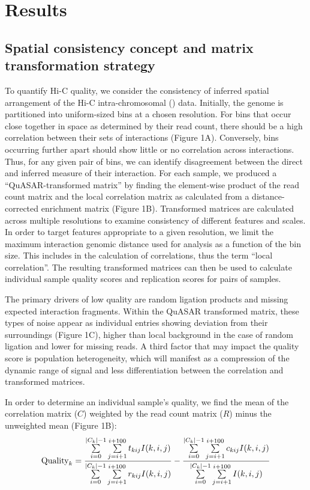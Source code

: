 \section{Results}
\subsection{Spatial consistency concept and matrix transformation strategy}

To quantify Hi-C quality, we consider the consistency of inferred spatial arrangement of the Hi-C intra-chromosomal (\cis) data. Initially, the genome is partitioned into uniform-sized bins at a chosen resolution. For bins that occur close together in space as determined by their read count, there should be a high correlation between their sets of \cis interactions (Figure 1A). Conversely, bins occurring further apart should show little or no correlation across interactions. Thus, for any given pair of bins, we can identify disagreement between the direct and inferred measure of their interaction. For each sample, we produced a ``QuASAR-transformed matrix'' by finding the element-wise product of the read count matrix and the local correlation matrix as calculated from a distance-corrected enrichment matrix (Figure 1B). Transformed matrices are calculated across multiple resolutions to examine consistency of different features and scales. In order to target features appropriate to a given resolution, we limit the maximum interaction genomic distance used for analysis as a function of the bin size. This includes in the calculation of correlations, thus the term ``local correlation''. The resulting transformed matrices can then be used to calculate individual sample quality scores and replication scores for pairs of samples.

The primary drivers of low quality are random ligation products and missing expected interaction fragments. Within the QuASAR transformed matrix, these types of noise appear as individual entries showing deviation from their surroundings (Figure 1C), higher than local background in the case of random ligation and lower for missing reads. A third factor that may impact the quality score is population heterogeneity, which will manifest as a compression of the dynamic range of signal and less differentiation between the correlation and transformed matrices.

In order to determine an individual sample's quality, we find the mean of the correlation matrix ($C$) weighted by the read count matrix ($R$) minus the unweighted mean (Figure 1B):
\[\textnormal{Quality}_{k}=\frac{\sum\limits_{i=0}^{|C_k|-1}\sum\limits_{j=i+1}^{i+100}t_{kij}I(k,i,j)}{\sum\limits_{i=0}^{|C_k|-1}\sum\limits_{j=i+1}^{i+100}r_{kij}I(k,i,j)}-\frac{\sum\limits_{i=0}^{|C_k|-1}\sum\limits_{j=i+1}^{i+100}c_{kij}I(k,i,j)}{\sum\limits_{i=0}^{|C_k|-1}\sum\limits_{j=i+1}^{i+100}I(k,i,j)}\]

